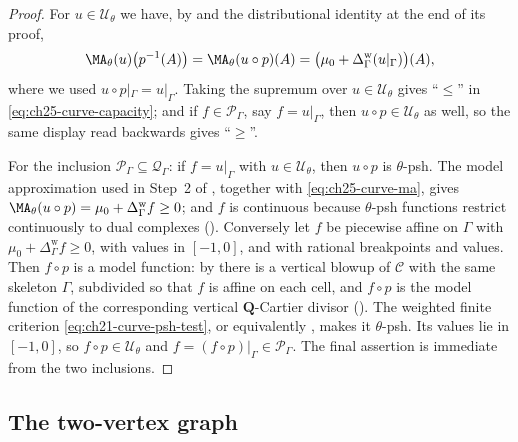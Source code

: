 \begin{proof}
For $u\in\mathcal U_\theta$ we have, by
 and
the distributional identity at the end of its proof,
\[
 \MA_\theta(u)\bigl(p^{-1}(A)\bigr)=\MA_\theta(u\circ p)(A)
 =\bigl(\mu_0+\Delta^{\mathrm w}_\Gamma(u|_\Gamma)\bigr)(A),
\]
where we used $u\circ p|_\Gamma=u|_\Gamma$.  Taking the supremum over
$u\in\mathcal U_\theta$ gives ``$\leq$'' in
\eqref{eq:ch25-curve-capacity}; and if $f\in\mathcal P_\Gamma$, say
$f=u|_\Gamma$, then $u\circ p\in\mathcal U_\theta$ as well, so the same
display read backwards gives ``$\geq$''.

For the inclusion $\mathcal P_\Gamma\subseteq\mathcal Q_\Gamma$: if
$f=u|_\Gamma$ with $u\in\mathcal U_\theta$, then $u\circ p$ is
$\theta$-psh.  The model approximation used in Step~2 of
, together with
\eqref{eq:ch25-curve-ma}, gives
$\MA_\theta(u\circ p)=\mu_0+\Delta^{\mathrm w}_\Gamma f\geq0$; and $f$ is continuous because
$\theta$-psh functions restrict continuously to dual complexes
().  Conversely let $f$ be piecewise
affine on $\Gamma$ with
$\mu_0+\Delta^{\mathrm w}_\Gamma f\geq0$, with values in
$[-1,0]$, and with rational breakpoints and values.  Then $f\circ p$ is a
model function: by  there is a vertical blowup
of $\mathcal C$ with the same skeleton $\Gamma$, subdivided so that
$f$ is affine on each cell, and $f\circ p$ is the model function of the
corresponding vertical $\mathbf Q$-Cartier divisor
().  The weighted finite criterion
\eqref{eq:ch21-curve-psh-test}, or equivalently
, makes it $\theta$-psh.  Its values lie in
$[-1,0]$, so $f\circ p\in\mathcal U_\theta$ and
$f=(f\circ p)|_\Gamma\in\mathcal P_\Gamma$.  The final assertion is
immediate from the two inclusions.
\end{proof}

\subsection{The two-vertex graph}
\label{sec:ch25-two-vertex}

